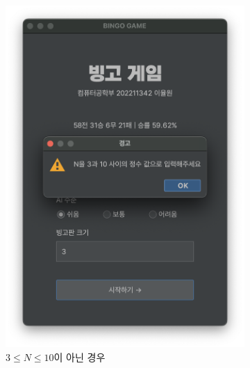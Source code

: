 \begin{figure}[H]
\begin{subfigure}{.5\textwidth}
        \includegraphics[scale=0.4]{img/main-n-range-error.png}
        \caption{$3 \leq N \leq 10$이 아닌 경우}
    \end{subfigure}
    \begin{subfigure}{\textwidth}
        \centering

\end{subfigure}
\end{figure}
